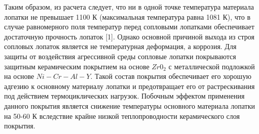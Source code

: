 Таким образом, из расчета следует, что ни в одной точке температура материала лопатки не превышает 1100 К (максимальная температура
равна 1081 К), что в случае равномерного поля температур перед сопловыми лопатками обеспечивает достаточную прочность лопаток [1].
Однако основной причиной выхода из строя сопловых лопаток является не температурная деформация, а коррозия.
Для защиты от воздействия агрессивной среды сопловые лопатки покрываются защитным керамическим покрытием на основе
$Zr0_2$ с металлической подложкой на основе $Ni-Cr-Al-Y$. Такой состав покрытия обеспечивает его хорошую адгезию к
основному материалу лопатки и предотвращает его от растрескивания под действием термоциклических нагрузок.
Побочным эффектом применения данного покрытия является снижение температуры основного материала лопатки на 50-60 К
вследствие крайне низкой теплопроводности керамического слоя покрытия.
